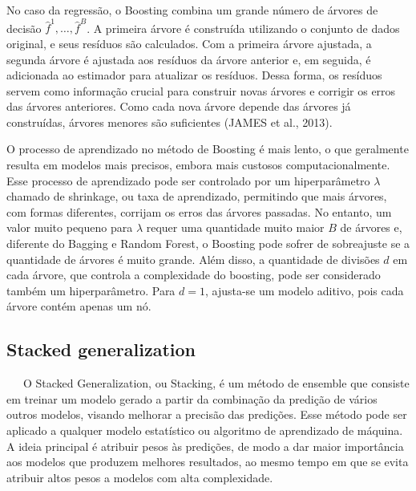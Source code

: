 \documentclass[
  12pt,
  a4paper,
]{scrreprt}
\begin{document}
\vspace{12pt}

No caso da regressão, o Boosting combina um grande número de árvores de
decisão \(\hat{f}^1, \dots, \hat{f}^B\). A primeira árvore é construída
utilizando o conjunto de dados original, e seus resíduos são calculados.
Com a primeira árvore ajustada, a segunda árvore é ajustada aos resíduos
da árvore anterior e, em seguida, é adicionada ao estimador para
atualizar os resíduos. Dessa forma, os resíduos servem como informação
crucial para construir novas árvores e corrigir os erros das árvores
anteriores. Como cada nova árvore depende das árvores já construídas,
árvores menores são suficientes (JAMES et al., 2013).

\vspace{12pt}

O processo de aprendizado no método de Boosting é mais lento, o que
geralmente resulta em modelos mais precisos, embora mais custosos
computacionalmente. Esse processo de aprendizado pode ser controlado por
um hiperparâmetro \(\lambda\) chamado de shrinkage, ou taxa de
aprendizado, permitindo que mais árvores, com formas diferentes,
corrijam os erros das árvores passadas. No entanto, um valor muito
pequeno para \(\lambda\) requer uma quantidade muito maior \(B\) de
árvores e, diferente do Bagging e Random Forest, o Boosting pode sofrer
de sobreajuste se a quantidade de árvores é muito grande. Além disso, a
quantidade de divisões \(d\) em cada árvore, que controla a complexidade
do boosting, pode ser considerado também um hiperparâmetro. Para
\(d = 1\), ajusta-se um modelo aditivo, pois cada árvore contém apenas
um nó.

\subsection{Stacked generalization}\label{stacked-generalization}

~~~O Stacked Generalization, ou Stacking, é um método de ensemble que
consiste em treinar um modelo gerado a partir da combinação da predição
de vários outros modelos, visando melhorar a precisão das predições.
Esse método pode ser aplicado a qualquer modelo estatístico ou algoritmo
de aprendizado de máquina. A ideia principal é atribuir pesos às
predições, de modo a dar maior importância aos modelos que produzem
melhores resultados, ao mesmo tempo em que se evita atribuir altos pesos
a modelos com alta complexidade.

\vspace{12pt}
\end{document}
